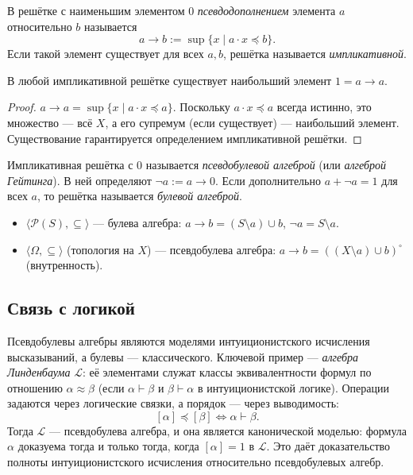 \documentclass[10pt]{article}
\begin{document}
\begin{definition}
В решётке с наименьшим элементом $0$ \emph{псевдодополнением} элемента $a$ относительно $b$ называется
$$ a\rightarrow b := \sup\{ x \mid a\cdot x \preceq b \}. $$
Если такой элемент существует для всех $a,b$, решётка называется \emph{импликативной}.
\end{definition}

\begin{lemma}
В любой импликативной решётке существует наибольший элемент $1 = a\rightarrow a$.
\end{lemma}
\begin{proof}
$a\rightarrow a = \sup\{ x \mid a\cdot x \preceq a \}$. Поскольку $a\cdot x \preceq a$ всегда истинно, это множество — всё $X$, а его супремум (если существует) — наибольший элемент. Существование гарантируется определением импликативной решётки.
\end{proof}

\begin{definition}
Импликативная решётка с $0$ называется \emph{псевдобулевой алгеброй} (или \emph{алгеброй Гейтинга}). В ней определяют $\neg a := a\rightarrow 0$. Если дополнительно $a + \neg a = 1$ для всех $a$, то решётка называется \emph{булевой алгеброй}.
\end{definition}

\begin{example}
\begin{itemize}
    \item $\langle \mathcal{P}(S), \subseteq \rangle$ — булева алгебра: $a\rightarrow b = (S\setminus a)\cup b$, $\neg a = S\setminus a$.
    \item $\langle \Omega, \subseteq \rangle$ (топология на $X$) — псевдобулева алгебра: $a\rightarrow b = ((X\setminus a)\cup b)^\circ$ (внутренность).
\end{itemize}
\end{example}

\subsection{Связь с логикой}
Псевдобулевы алгебры являются моделями интуиционистского исчисления высказываний, а булевы — классического. Ключевой пример — \emph{алгебра Линденбаума} $\mathcal{L}$: её элементами служат классы эквивалентности формул по отношению $\alpha\approx\beta$ (если $\alpha\vdash\beta$ и $\beta\vdash\alpha$ в интуиционистской логике). Операции задаются через логические связки, а порядок — через выводимость:
$$ [\alpha] \preceq [\beta] \iff \alpha\vdash\beta. $$
Тогда $\mathcal{L}$ — псевдобулева алгебра, и она является канонической моделью: формула $\alpha$ доказуема тогда и только тогда, когда $[\alpha] = 1$ в $\mathcal{L}$. Это даёт доказательство полноты интуиционистского исчисления относительно псевдобулевых алгебр.
\end{document}
